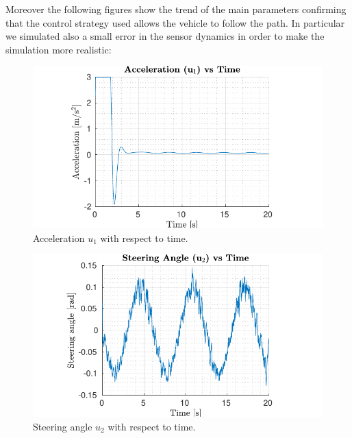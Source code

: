 \documentclass[conference, 11pt]{IEEEtran}
\begin{document}
Moreover the following figures show the trend of the main parameters confirming that the control strategy used allows the vehicle to follow the path. In particular we simulated also a small error in the sensor dynamics in order to make the simulation more realistic:

\begin{figure}[!h]
	\centering
	\hspace*{-0.5in}
	\includegraphics[width=1.29\columnwidth]{../../MATLAB/lane_following/figure/AccelerationVsTime.pdf}
	\caption{Acceleration $u_1$ with respect to time.}
	\label{fig:acceleration_laneFollowing}
\end{figure}
\begin{figure}[!h]
	\centering
	\hspace*{-0.5in}
	\includegraphics[width=1.29\columnwidth]{../../MATLAB/lane_following/figure/SteeringAngleVsTime.pdf}
	\caption{Steering angle $u_2$ with respect to time.}
	\label{fig:steering_laneFollowing}
\end{figure}
\end{document}

